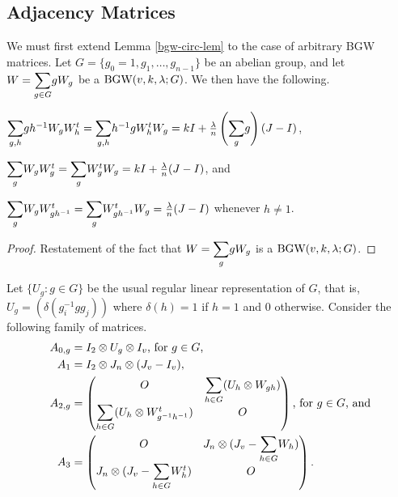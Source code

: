 \documentclass[../../../main]{subfiles}
\begin{document}
\subsection{Adjacency Matrices}

We must first extend Lemma \ref{bgw-circ-lem} to the case of arbitrary BGW
matrices. Let $G=\{g_0=1,g_1,\dots,g_{n-1}\}$ be an abelian group, and let
$W=\ssum_{g \in G}g W_g$ be a $\text{BGW}(v,k,\lambda; G)$. We then have the
following. 

\begin{lem}
 \begin{defenum}
  \item[]
  \item $\ssum_{g,h}gh^{-1}W_gW_h^t = \ssum_{g,h}h^{-1}gW_h^tW_g = kI + \frac{\lambda}{n}\left(\ssum_gg\right)(J-I)$,
  \item $\ssum_gW_gW_g^t = \ssum_gW_g^tW_g = kI + \frac{\lambda}{n}(J-I)$, and
  \item $\ssum_gW_gW_{gh^{-1}}^t = \ssum_gW_{gh^{-1}}^tW_g = \frac{\lambda}{n}(J-I)$ whenever $h \neq 1$.
 \end{defenum}
\end{lem}

\begin{proof}
 Restatement of the fact that $W = \ssum_ggW_g$ is a $\text{BGW}(v,k,\lambda;G)$.
\end{proof}

Let $\{U_g : g \in G\}$ be the usual regular linear representation of $G$, that is, $U_g = (\delta(g_i^{-1}gg_j))$ where $\delta(h) = 1$ if $h=1$ and $0$ otherwise. Consider the following family of matrices.
\begin{align*}
 A_{0,g} &= I_2 \otimes U_g \otimes I_v \text{, for $g \in G$,} \\
 A_1 &= I_2 \otimes J_n \otimes (J_v-I_v), \\
 A_{2,g} &= \begin{pmatrix} O & \ssum_{h \in G} (U_h \otimes W_{gh}) \\ \ssum_{h \in G} (U_h \otimes W_{g^{-1}h^{-1}}^t) & O \end{pmatrix} \text{, for $g \in G$, and} \\
 A_3 &= \begin{pmatrix} O & J_n \otimes (J_v - \ssum_{h \in G} W_h) \\ J_n \otimes (J_v - \ssum_{h \in G} W_h^t) & O \end{pmatrix}.
\end{align*}
\end{document}
